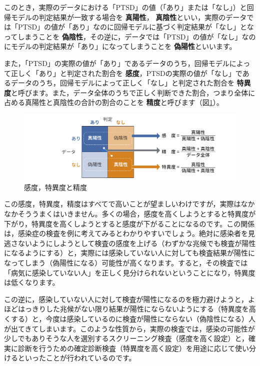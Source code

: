 \documentclass[
  12pt,
  a5jpaper,
  lualatex, ja=standard]{bxjsbook}
\renewcommand{\emph}[1]{\textbf{\color{emph} #1}}
\begin{document}
このとき，実際のデータにおける「PTSD」の値（「あり」または「なし」）と回帰モデルの判定結果が一致する場合を\emph{真陽性}，\emph{真陰性}といい，実際のデータでは「PTSD」の値が「あり」なのに回帰モデルに基づく判定結果が「なし」となってしまうことを\emph{偽陰性}，その逆に，データでは「PTSD」の値が「なし」なのにモデルの判定結果が「あり」になってしまうことを\emph{偽陽性}といいます。

また，「PTSD」の実際の値が「あり」であるデータのうち，回帰モデルによって正しく「あり」と判定された割合を\emph{感度}，PTSDの実際の値が「なし」であるデータのうち，回帰モデルによって正しく「なし」と判定された割合を\emph{特異度}と呼びます。また，データ全体のうちで正しく判断できた割合，つまり全体に占める真陽性と真陰性の合計の割合のことを\emph{精度}と呼びます（図\ref{fig:regression-binomial-signal}）。

\begin{figure}[!ht]

{\centering \includegraphics[width=1\linewidth]{images/regression/binomial-signal} 

}

\caption{感度，特異度と精度}\label{fig:regression-binomial-signal}
\end{figure}

この感度，特異度，精度はすべてで高いことが望ましいわけですが，実際はなかなかそううまくはいきません。多くの場合，感度を高くしようとすると特異度が下がり，特異度を高くしようとすると感度が下がることになるのです。この関係は，感染症の検査を例に考えてみるとわかりやすいでしょう。絶対に感染者を見逃さないようにしようとして検査の感度を上げる（わずかな兆候でも検査が陽性になるようにする）と，実際には感染していない人に対しても検査結果が陽性になってしまう（偽陽性になる）可能性が高くなります。すると，その検査では「病気に感染していない人」を正しく見分けられないということになり，特異度は低くなります。

この逆に，感染していない人に対して検査が陽性になるのを極力避けようと，よほどはっきりした兆候がない限り結果が陽性にならないようにする（特異度を高くする）と，今度は感染しているのに検査が陽性にならない（偽陰性になる）人が出てきてしまいます。このような性質から，実際の検査では，感染の可能性が少しでもありそうな人を選別するスクリーニング検査（感度を高く設定）と，確実に診断を行うための確定診断検査（特異度を高く設定）を用途に応じて使い分けるといったことが行われているのです。
\end{document}
